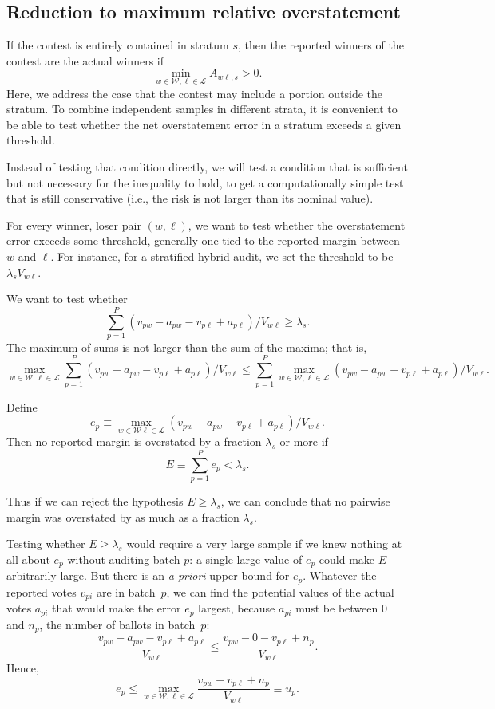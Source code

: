 \subsection{Reduction to maximum relative overstatement}
If the contest is entirely contained in stratum $s$, then
the reported winners of the contest are the actual winners if
$$ 
   \min_{w \in \mathcal{W}, \ell \in \mathcal{L}} A_{w\ell,s} > 0.
$$
Here, we address the case that the contest may include a portion outside the stratum.
To combine independent samples in different strata, it is convenient
to be able to test whether the net overstatement error in a stratum exceeds a given threshold.

Instead of testing that condition directly, we will test a condition that is sufficient 
but not necessary for the inequality to hold, to get a computationally simple test that
is still conservative (i.e., the risk is not larger than its nominal value).

For every winner, loser pair $(w, \ell)$, we want to test
whether the overstatement error exceeds some threshold, generally
one tied to the reported margin between $w$ and $\ell$.
For instance, for a stratified hybrid audit, we set the threshold to be
$\lambda_s V_{w\ell}$.

We want to test whether
$$
   \sum_{p=1}^P (v_{pw}-a_{pw} - v_{p\ell} + a_{p\ell})/V_{w\ell} \ge \lambda_s.
$$
The maximum of sums is not larger than the sum of the maxima; that is,
$$
\max_{w \in \mathcal{W},  \ell \in \mathcal{L}}
   \sum_{p=1}^P (v_{pw}-a_{pw} - v_{p\ell} + a_{p\ell})/V_{w\ell}
   \le
  \sum_{p=1}^P  \max_{w \in \mathcal{W},  \ell \in \mathcal{L}} 
  (v_{pw}-a_{pw} - v_{p\ell} + a_{p\ell})/V_{w\ell}.
$$

Define 
$$
  e_p \equiv \max_{w \in \mathcal{W} \ell \in \mathcal{L}} 
     (v_{pw}-a_{pw} - v_{p\ell} + a_{p\ell})/V_{w\ell}.
$$
Then no reported margin is overstated by a fraction $\lambda_s$ or more
if 
$$ 
  E \equiv \sum_{p=1}^P e_p < \lambda_s.
$$

Thus if we can reject the hypothesis $E \ge \lambda_s$, we can conclude that
no pairwise margin was overstated by as much as a fraction $\lambda_s$.

Testing whether $E \ge \lambda_s$ would require a very large sample if we knew nothing at
all about $e_p$ without auditing batch $p$: a single large value of $e_p$ could make
$E$ arbitrarily large.
But there is an \emph{a priori} upper bound for $e_p$.
Whatever the reported votes $v_{pi}$ are in batch~$p$, we can find the
potential values of the actual votes $a_{pi}$ that would make the
error $e_p$ largest, because $a_{pi}$ must be between 0 and $n_p$,
the number of ballots in batch~$p$:
$$
    \frac{v_{pw}-a_{pw} - v_{p\ell} + a_{p\ell}}{V_{w\ell}} \le 
    \frac{v_{pw}- 0 - v_{p\ell} + n_p}{V_{w\ell}}.
$$
Hence,
\begin{equation} \label{eq:uDef}
    e_p \le \max_{w \in \mathcal{W}, \ell \in \mathcal{L}} 
    \frac{v_{pw} - v_{p\ell} + n_p}{V_{w\ell}} \equiv u_p.
\end{equation}

